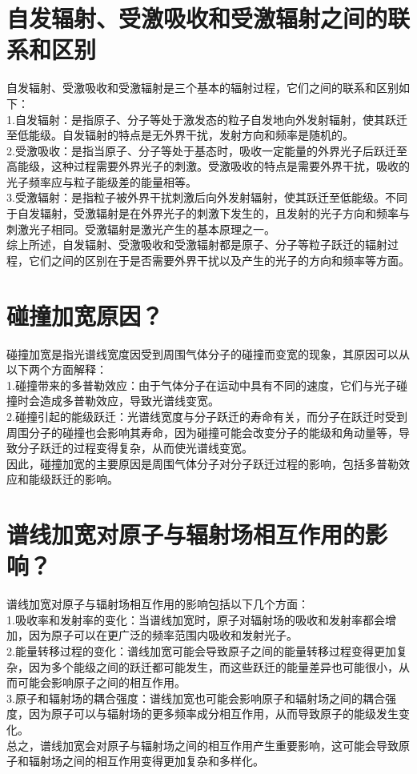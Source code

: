 \documentclass[12pt, a4paper, oneside]{article}
\begin{document}
\begin{spacing}{2.0}
\section{自发辐射、受激吸收和受激辐射之间的联系和区别 }

自发辐射、受激吸收和受激辐射是三个基本的辐射过程，它们之间的联系和区别如下：
\\
1.自发辐射：是指原子、分子等处于激发态的粒子自发地向外发射辐射，使其跃迁至低能级。自发辐射的特点是无外界干扰，发射方向和频率是随机的。
\\
2.受激吸收：是指当原子、分子等处于基态时，吸收一定能量的外界光子后跃迁至高能级，这种过程需要外界光子的刺激。受激吸收的特点是需要外界干扰，吸收的光子频率应与粒子能级差的能量相等。
\\
3.受激辐射：是指粒子被外界干扰刺激后向外发射辐射，使其跃迁至低能级。不同于自发辐射，受激辐射是在外界光子的刺激下发生的，且发射的光子方向和频率与刺激光子相同。受激辐射是激光产生的基本原理之一。
\\
综上所述，自发辐射、受激吸收和受激辐射都是原子、分子等粒子跃迁的辐射过程，它们之间的区别在于是否需要外界干扰以及产生的光子的方向和频率等方面。


\section{碰撞加宽原因？   }
碰撞加宽是指光谱线宽度因受到周围气体分子的碰撞而变宽的现象，其原因可以从以下两个方面解释：\\

1.碰撞带来的多普勒效应：由于气体分子在运动中具有不同的速度，它们与光子碰撞时会造成多普勒效应，导致光谱线变宽。
\\
2.碰撞引起的能级跃迁：光谱线宽度与分子跃迁的寿命有关，而分子在跃迁时受到周围分子的碰撞也会影响其寿命，因为碰撞可能会改变分子的能级和角动量等，导致分子跃迁的过程变得复杂，从而使光谱线变宽。
\\
因此，碰撞加宽的主要原因是周围气体分子对分子跃迁过程的影响，包括多普勒效应和能级跃迁的影响。
\section{谱线加宽对原子与辐射场相互作用的影响？}

谱线加宽对原子与辐射场相互作用的影响包括以下几个方面：
\\
1.吸收率和发射率的变化：当谱线加宽时，原子对辐射场的吸收和发射率都会增加，因为原子可以在更广泛的频率范围内吸收和发射光子。
\\
2.能量转移过程的变化：谱线加宽可能会导致原子之间的能量转移过程变得更加复杂，因为多个能级之间的跃迁都可能发生，而这些跃迁的能量差异也可能很小，从而可能会影响原子之间的相互作用。
\\
3.原子和辐射场的耦合强度：谱线加宽也可能会影响原子和辐射场之间的耦合强度，因为原子可以与辐射场的更多频率成分相互作用，从而导致原子的能级发生变化。
\\
总之，谱线加宽会对原子与辐射场之间的相互作用产生重要影响，这可能会导致原子和辐射场之间的相互作用变得更加复杂和多样化。

\end{spacing}
\end{document}
